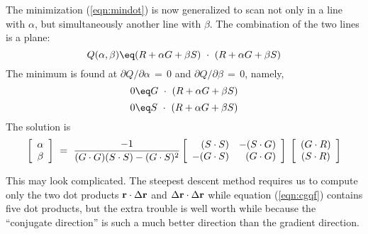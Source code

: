 \par
The minimization (\ref{eqn:mindot}) is now generalized
to scan not only in a line with $\alpha$,
but simultaneously another line with $\beta$.
The combination of the two lines is a plane:
\begin{equation}
Q(\alpha ,\beta ) \eq
( R + \alpha G + \beta S) \ \cdot\  (R + \alpha G + \beta S )
\label{eqn:cgqf}
\end{equation}
The minimum is found at  $\partial Q / \partial \alpha \,=\,0$  and
$\partial Q / \partial \beta \,=\,0$, namely,
\begin{equation}
0\eq G \ \cdot\  ( R + \alpha G + \beta S )
\end{equation}
\begin{equation}
0\eq S \ \cdot\  ( R + \alpha G + \beta S )
\end{equation}
The solution is
\begin{equation}
\label{eqn:twobytwosln}
\left[ 
\begin{array}{c}
  \alpha \\ 
  \beta \end{array} \right] 
\ = \ 
        {-1 \over (G\cdot G)(S\cdot S)-(G\cdot S)^2}
\left[ 
\begin{array}{rr}
  (S \cdot S) & -(S \cdot G)  \\
  -(G \cdot S) & (G \cdot G)  \end{array} \right] 
\; \left[ 
\begin{array}{c}
  (G\cdot R) \\
  (S\cdot R) \end{array} \right]
\end{equation}

This may look complicated.
The steepest descent method requires us to compute
only the two dot products
$       \bold r \cdot \Delta \bold r$ and
$\Delta \bold r \cdot \Delta \bold r$
while equation (\ref{eqn:cgqf}) contains five dot products,
but the extra trouble is well worth while because the ``conjugate direction''
is such a much better direction than the gradient direction.

